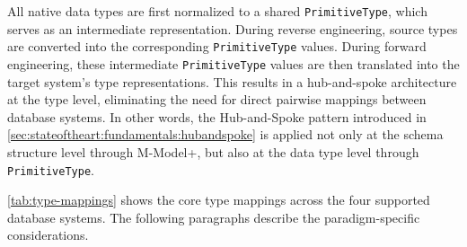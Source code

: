   All native data types are first normalized to a shared \texttt{Primi\-tive\-Type}, which serves as an intermediate representation. During reverse
  engineering, source types are converted into the corresponding \texttt{Primi\-tive\-Type} values. During forward engineering, these intermediate
  \texttt{Primi\-tive\-Type} values are then translated into the target system's type representations. This results in a hub-and-spoke architecture
  at the type level, eliminating the need for direct pairwise mappings between database systems. In other words, the Hub-and-Spoke pattern
  introduced in \autoref{sec:stateoftheart:fundamentals:hubandspoke} is applied not only at the schema structure level through M-Model+, but also at
   the data type level through \texttt{Primi\-tive\-Type}.

\autoref{tab:type-mappings} shows the core type mappings across the four supported database systems. The following paragraphs describe the
  paradigm-specific considerations.
